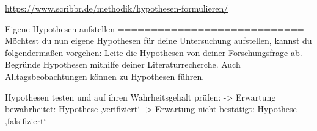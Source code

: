 \url{https://www.scribbr.de/methodik/hypothesen-formulieren/}

Eigene Hypothesen aufstellen
============================
Möchtest du nun eigene Hypothesen für deine Untersuchung aufstellen, kannst du folgendermaßen vorgehen:
    Leite die Hypothesen von deiner Forschungsfrage ab.
    Begründe Hypothesen mithilfe deiner Literaturrecherche.
    Auch Alltagsbeobachtungen können zu Hypothesen führen.

Hypothesen testen und auf ihren Wahrheitsgehalt prüfen:
-> Erwartung bewahrheitet: Hypothese ‚verifiziert‘
-> Erwartung nicht bestätigt: Hypothese ‚falsifiziert‘
